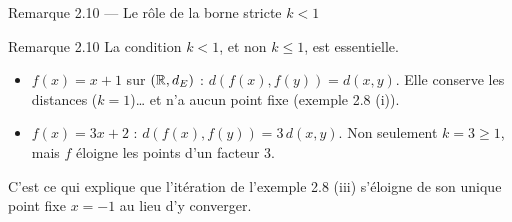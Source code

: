 \begin{frame}{Remarque 2.10 --- Le rôle de la borne stricte $k<1$}
  \begin{Rem}{Remarque 2.10}
    La condition $k<1$, et non $k\leq1$, est essentielle.
    \begin{itemize}
      \item $f(x)=x+1$ sur $(\operatorname{\mathbb{R}},d_E)$ : $d(f(x),f(y)) = d(x,y)$. Elle
        conserve les distances ($k=1$)… et n'a aucun point fixe
        (exemple 2.8 (i)).
      \item $f(x)=3x+2$ : $d(f(x),f(y)) = 3\,d(x,y)$. Non seulement
        $k=3\geq1$, mais $f$ éloigne les points d'un facteur $3$.
    \end{itemize}
    \vspace{2pt}
    C'est ce qui explique que l'itération de l'exemple 2.8 (iii)
    s'éloigne de son unique point fixe $x=-1$ au lieu d'y converger.
  \end{Rem}
\end{frame}
